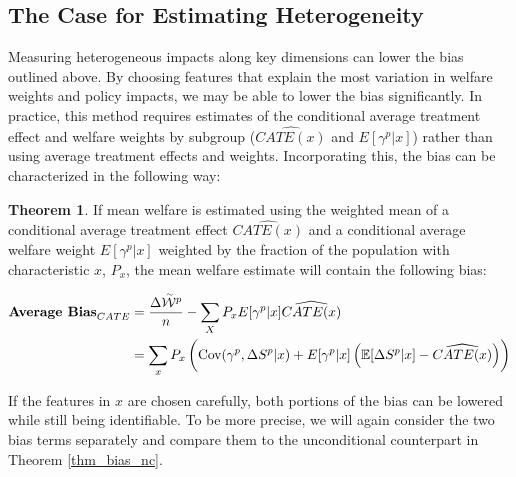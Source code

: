 \documentclass[12pt]{article}
\theoremstyle{definition}
\theoremstyle{definition}
\theoremstyle{definition}
\theoremstyle{definition}
\newtheorem{thm}{Theorem}
\begin{document}




\subsection{The Case for Estimating Heterogeneity}

 Measuring heterogeneous impacts along key dimensions can lower the bias outlined above. By choosing features that explain the most variation in welfare weights and policy impacts, we may be able to lower the bias significantly. In practice, this method requires estimates of the conditional average treatment effect and welfare weights by subgroup ($\widehat{CATE(x)}$ and $E[\gamma^p|x]$) rather than using average treatment effects and weights. Incorporating this, the bias can be characterized in the following way:

    \begin{thm}
    \label{thm_cond_bias}
       If mean welfare is estimated using the weighted mean of a conditional average treatment effect $\widehat{CATE(x)}$ and a conditional average welfare weight $E[\gamma^p|x]$ weighted by the fraction of the population with characteristic $x$, $P_x$,  the mean welfare estimate will contain the following bias: 
        
        \begin{align*}
        \textbf{Average Bias}_{CATE} &= \frac{\Delta \accentset{\sim}{\mathcal{W}}^p}{n} -  \sum_{X} P_x E[\gamma^p|x] \widehat{CATE(x)}  \\
       & = \sum_{x} P_x \left( \mathrm{Cov}(\gamma^p, \Delta S^p| x) + E[\gamma^p|x] \left( \mathbb{E}[\Delta S^p|x]-\widehat{CATE(x)} \right)\right)
    \end{align*}
    \end{thm}

    If the features in $x$ are chosen carefully, both portions of the bias can be lowered while still being identifiable. To be more precise, we will again consider the two bias terms separately and compare them to the unconditional counterpart in Theorem \ref{thm_bias_nc}. 
\end{document}
